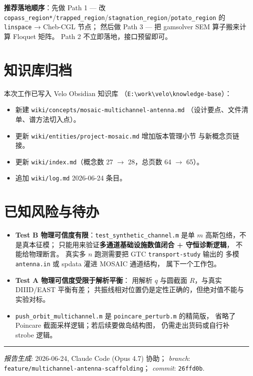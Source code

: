 \documentclass[11pt,a4paper]{article}
\begin{document}
\textbf{推荐落地顺序}：先做 Path 1 — 改 \texttt{copass\_region*}/\texttt{trapped\_region}/\texttt{stagnation\_region}/\texttt{potato\_region} 的 \texttt{linspace} → Cheb-CGL 节点；
然后做 Path 3 — 把 gamsolver SEM 算子搬来计算 Floquet 矩阵。
Path 2 不立即落地，接口预留即可。

\section{知识库归档}

本次工作已写入 Velo Obsidian 知识库
（\texttt{E:\textbackslash work\textbackslash velo\textbackslash knowledge-base}）：

\begin{itemize}[leftmargin=*]
\item 新建 \texttt{wiki/concepts/mosaic-multichannel-antenna.md}
      （设计要点、文件清单、谱方法切入点）。
\item 更新 \texttt{wiki/entities/project-mosaic.md} 增加版本管理小节
      与新概念页链接。
\item 更新 \texttt{wiki/index.md}（概念数 27 $\to$ 28，总页数 64 $\to$ 65）。
\item 追加 \texttt{wiki/log.md} 2026-06-24 条目。
\end{itemize}

\section{已知风险与待办}

\begin{itemize}[leftmargin=*]
\item \textbf{Test B 物理可信度有限}：\texttt{test\_synthetic\_channel.m} 是单 $m$
      高斯包络，不是真本征模；
      只能用来验证\textbf{多通道基础设施数值闭合 + 守恒诊断逻辑}，
      不能给物理断言。
      真实多 $n$ 跑测需要把 GTC \texttt{transport-study} 输出的
      多模 \texttt{antenna.in} 或 spdata 灌进 MOSAIC 通道结构，
      属下一个工作包。
\item \textbf{Test A 物理可信度受限于解析平衡}：
      用解析 $q$ 与圆截面 $R$，与真实 DIIID/EAST 平衡有差；
      共振线相对位置仍是定性正确的，但绝对值不能与实验对标。
\item \texttt{push\_orbit\_multichannel.m} 是 \texttt{poincare\_perturb.m} 的精简版，
      省略了 Poincare 截面采样逻辑；若后续要做岛结构图，
      仍需走出货码或自行补 strobe 逻辑。
\end{itemize}

\vspace{1em}
\hrule
\vspace{0.5em}
{\footnotesize
\textit{报告生成}: 2026-06-24, Claude Code (Opus 4.7) 协助；
\textit{branch}: \texttt{feature/multichannel-antenna-scaffolding}；
\textit{commit}: \texttt{26ffd0b}.
}
\end{document}
